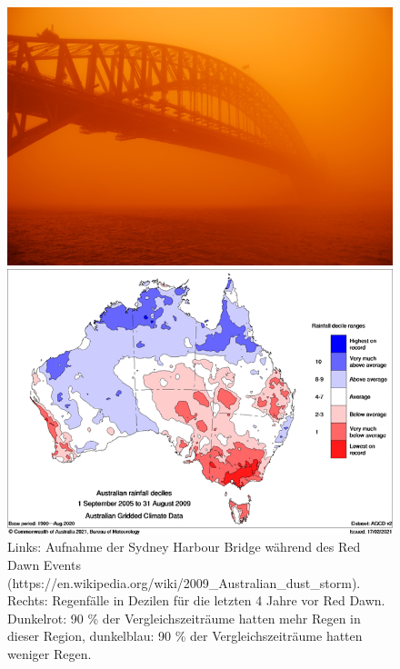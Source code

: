 \documentclass[12pt,a4paper,onecolumn,headheight=30pt]{scrartcl}
\begin{document}
\begin{figure}[htbp]
	\begin{minipage}[c]{0.5\textwidth}
		\includegraphics[width=\textwidth]{bilder/reddawn/SHB.jpg}
	\end{minipage}\hfill
	\begin{minipage}[c]{0.49\textwidth}
		\includegraphics[width=\textwidth]{bilder/reddawn/drought.png}
	\end{minipage}\hfill
	\caption{Links: Aufnahme der Sydney Harbour Bridge während des Red Dawn Events (https://en.wikipedia.org/wiki/2009_Australian_dust_storm). Rechts: Regenfälle in Dezilen für die letzten 4 Jahre vor Red Dawn. Dunkelrot: 90 \% der Vergleichszeiträume hatten mehr Regen in dieser Region, dunkelblau: 90 \% der Vergleichszeiträume hatten weniger Regen.} \label{fig:reddawn}
\end{figure}
\end{document}
